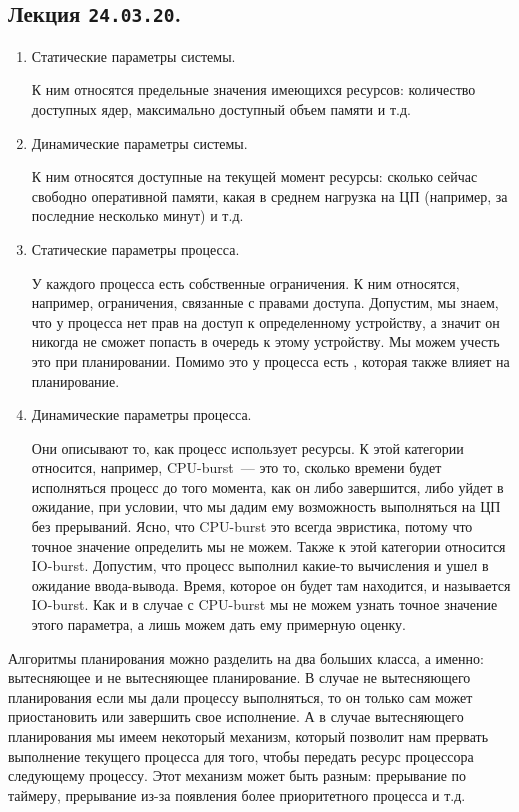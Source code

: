 \subsection{%
  Лекция \texttt{24.03.20}.%
}


\begin{enumerate}
\item
  Статические параметры системы.

  К ним относятся предельные значения имеющихся ресурсов: количество доступных
  ядер, максимально доступный объем памяти и т.д.

\item
  Динамические параметры системы.

  К ним относятся доступные на текущей момент ресурсы: сколько сейчас свободно
  оперативной памяти, какая в среднем нагрузка на ЦП (например, за последние
  несколько минут) и т.д.

\item
  Статические параметры процесса.

  У каждого процесса есть собственные ограничения. К ним относятся, например,
  ограничения, связанные с правами доступа. Допустим, мы знаем, что у процесса
  нет прав на доступ к определенному устройству, а значит он никогда не сможет
  попасть в очередь к этому устройству. Мы можем учесть это при планировании.
  Помимо это у процесса есть , которая также влияет на
  планирование.

\item
  Динамические параметры процесса.

  Они описывают то, как процесс использует ресурсы. К этой категории относится,
  например, CPU-burst~--- это то, сколько времени будет исполняться процесс до
  того момента, как он либо завершится, либо уйдет в ожидание, при условии, что
  мы дадим ему возможность выполняться на ЦП без прерываний. Ясно, что CPU-burst
  это всегда эвристика, потому что точное значение определить мы не можем. Также
  к этой категории относится IO-burst. Допустим, что процесс выполнил какие-то
  вычисления и ушел в ожидание ввода-вывода. Время, которое он будет там
  находится, и называется IO-burst. Как и в случае с CPU-burst мы не можем
  узнать точное значение этого параметра, а лишь можем дать ему примерную
  оценку.
\end{enumerate}


Алгоритмы планирования можно разделить на два больших класса, а именно:
вытесняющее и не вытесняющее планирование. В случае не вытесняющего планирования
если мы дали процессу выполняться, то он только сам может приостановить или
завершить свое исполнение. А в случае вытесняющего планирования мы имеем
некоторый механизм, который позволит нам прервать выполнение текущего процесса
для того, чтобы передать ресурс процессора следующему процессу. Этот механизм
может быть разным: прерывание по таймеру, прерывание из-за появления более
приоритетного процесса и т.д.

